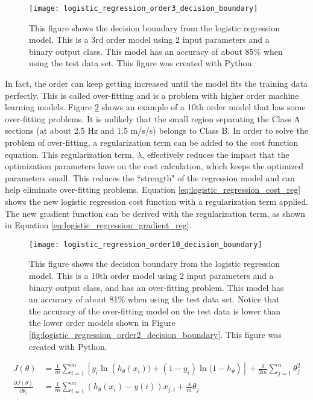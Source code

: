 \begin{figure}
	\centering
	\texttt{[image: logistic\_regression\_order3\_decision\_boundary]}
	\decoRule
	\caption{This figure shows the decision boundary from the logistic regression model.  This is a 3rd order model using 2 input parameters and a binary output class.  This model has an accuracy of about 85\% when using the test data set.  This figure was created with Python.}
	\label{fig:logistic_regression_order3_decision_boundary}
\end{figure}

In fact, the order can keep getting increased until the model fits the training data perfectly.  This is called over-fitting and is a problem with higher order machine learning models.  Figure \ref{fig:logistic_regression_order10_decision_boundary} shows an example of a 10th order model that has some over-fitting problems.  It is unlikely that the small region separating the Class A sections (at about 2.5 Hz and 1.5 m/s/s) belongs to Class B.  In order to solve the problem of over-fitting, a regularization term can be added to the cost function equation.  This regularization term, $\lambda$, effectively reduces the impact that the optimization parameters have on the cost calculation, which keeps the optimized parameters small.  This reduces the ``strength" of the regression model and can help eliminate over-fitting problems.  Equation \ref{eq:logistic_regression_cost_reg} shows the new logistic regression cost function with a regularization term applied.  The new gradient function can be derived with the regularization term, as shown in Equation \ref{eq:logistic_regression_gradient_reg}.

\begin{figure}
	\centering
	\texttt{[image: logistic\_regression\_order10\_decision\_boundary]}
	\decoRule
	\caption{This figure shows the decision boundary from the logistic regression model.  This is a 10th order model using 2 input parameters and a binary output class, and has an over-fitting problem.  This model has an accuracy of about 81\% when using the test data set.  Notice that the accuracy of the over-fitting model on the test data is lower than the lower order models shown in Figure \ref{fig:logistic_regression_order2_decision_boundary}. This figure was created with Python.}
	\label{fig:logistic_regression_order10_decision_boundary}
\end{figure}

\begin{align}
	J(\theta) &= \frac{1}{m} \sum_{i=1}^{m}{\left[y_i \ln({h_{\theta}(x_i))} + (1-y_i) \ln{(1-h_{\theta}}) \right]} + \frac{\lambda}{2m} \sum_{j=1}^{n}{\theta_j^2} \label{eq:logistic_regression_cost_reg} \\	
	\frac{\partial J(\theta)}{\partial \theta_j} &= \frac{1}{m} \sum_{i=1}^{m}{\left(h_{\theta}(x_i) - y(i)\right) x_{j,i}} + \frac{\lambda}{m} \theta_j\label{eq:logistic_regression_gradient_reg}
\end{align}

